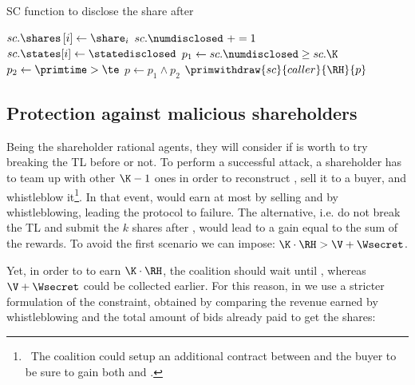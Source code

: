 \begin{algorithm}[t]
	\caption{SC function to disclose the share after \td}\label{algo:disclose}
	\begin{algorithmic}[1]
		\vspace{0.6em}
		\State $sc.\shares \left[ i \right] \gets \share_{i}$
		\State $sc.\numdisclosed\ += 1$
		\State $sc.\states[i]\gets \statedisclosed$
		\State $p_1 \gets sc.\numdisclosed \ge sc.\K$
		\State $p_2 \gets \primtime > \te$
		\State $p \gets p_1 \wedge p_2$
		\State $\primwithdraw{sc}{caller}{\RH}{p}$
		\EndIf
		\EndIf
		\EndIf
		\EndProcedure
	\end{algorithmic}
\end{algorithm}

\subsection{Protection against malicious shareholders}\label{sect:mal_sha}

Being the shareholder rational agents, they will consider if is worth to try breaking the TL before \td or not.
To perform a successful attack, a shareholder has to team up with other $\K - 1$ ones in order to reconstruct \secret, sell it to a buyer, and whistleblow it\footnote{\ The coalition \coalition could setup an additional contract between \coalition and the buyer to be sure to gain both \V and \Wsecret.}.
In that event, \coalition would earn at most by selling and by whistleblowing, leading the protocol to failure. 
The alternative, i.e. do not break the TL and submit the $k$ shares after \td, would lead to a gain equal to the sum of the rewards. 
To avoid the first scenario we can impose:
%
$\K \cdot \RH  > \V + \Wsecret$.

Yet, in order to to earn $\K \cdot \RH$, the coalition \coalition should wait until \td, whereas $\V + \Wsecret$ could be collected earlier.
For this reason, in \shortname we use a stricter formulation of the constraint, obtained by comparing the revenue earned by whistleblowing and the total amount of bids already paid \coalition to get the shares:

